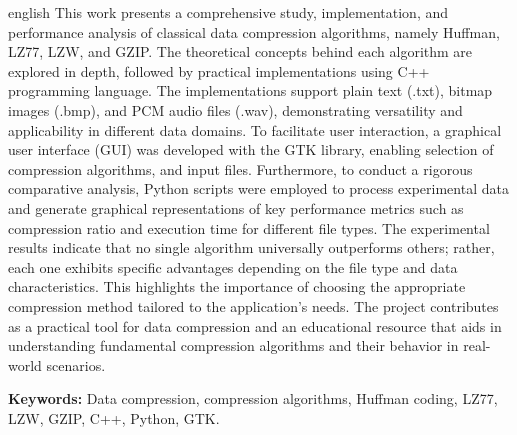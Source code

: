 \documentclass[
	12pt,				%
	openright,			%
	oneside,			%
	a4paper,			%
	english,			%
	french,				%
	spanish,			%
	brazil,				%
	]{lib/abntex2}
\newcommand{\listofquadrosname}{Lista de quadros}
\begin{document}
\begin{resumo}[Abstract]
	\begin{otherlanguage*}{english}
This work presents a comprehensive study, implementation, and performance analysis of classical data compression algorithms, namely Huffman, LZ77, LZW, and GZIP. The theoretical concepts behind each algorithm are explored in depth, followed by practical implementations using C++ programming language. The implementations support plain text (.txt), bitmap images (.bmp), and PCM audio files (.wav), demonstrating versatility and applicability in different data domains.
To facilitate user interaction, a graphical user interface (GUI) was developed with the GTK library, enabling selection of compression algorithms, and input files. Furthermore, to conduct a rigorous comparative analysis, Python scripts were employed to process experimental data and generate graphical representations of key performance metrics such as compression ratio and execution time for different file types.
The experimental results indicate that no single algorithm universally outperforms others; rather, each one exhibits
specific advantages depending on the file type and data characteristics. This highlights the importance of choosing the
appropriate compression method tailored to the application's needs. The project contributes as a practical tool for data compression and an educational resource that aids in understanding fundamental compression algorithms and their behavior in real-world scenarios.
		
\textbf{Keywords:} Data compression, compression algorithms, Huffman coding, LZ77, LZW, GZIP, C++, Python, GTK.
	\end{otherlanguage*}
\end{resumo}



\listoffigures*
\cleardoublepage

\end{document}
